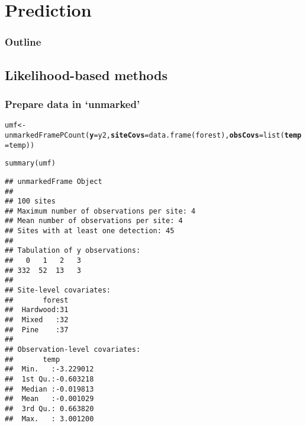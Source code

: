 \documentclass[color=usenames,dvipsnames]{beamer}\usepackage[]{graphicx}\usepackage[]{color}
\makeatletter
\newcommand{\hlstd}[1]{\textcolor[rgb]{0,0,0}{#1}}%
\newcommand{\hlkwb}[1]{\textcolor[rgb]{0,0.341,0.682}{#1}}%
\newcommand{\hlkwc}[1]{\textcolor[rgb]{0,0,0}{\textbf{#1}}}%
\newcommand{\hlkwd}[1]{\textcolor[rgb]{0.004,0.004,0.506}{#1}}%
\newenvironment{kframe}{%
 \def\at@end@of@kframe{}%
 \ifinner\ifhmode%
  \def\at@end@of@kframe{\end{minipage}}%
  \begin{minipage}{\columnwidth}%
 \fi\fi%
 \def\FrameCommand##1{\hskip\@totalleftmargin \hskip-\fboxsep
 \colorbox{shadecolor}{##1}\hskip-\fboxsep
     \hskip-\linewidth \hskip-\@totalleftmargin \hskip\columnwidth}%
 \MakeFramed {\advance\hsize-\width
   \@totalleftmargin\z@ \linewidth\hsize
   \@setminipage}}%
 {\par\unskip\endMakeFramed%
 \at@end@of@kframe}
\newenvironment{knitrout}{}{} %
\makeatother
\begin{document}
\begin{frame}[fragile]
\begin{columns}
\begin{column}{0.6\textwidth}
  \end{column}
  \end{columns}
\end{frame}



\section{Prediction}



\begin{frame}
  \frametitle{Outline}
  \Large
  \tableofcontents[currentsection]
\end{frame}



\subsection{Likelihood-based methods}



\begin{frame}[fragile]
  \frametitle{Prepare data in `unmarked'}
  \small
\begin{knitrout}\tiny
{}\color{fgcolor}\begin{kframe}
\begin{alltt}
\hlstd{umf} \hlkwb{<-} \hlkwd{unmarkedFramePCount}\hlstd{(}\hlkwc{y}\hlstd{=y2,} \hlkwc{siteCovs}\hlstd{=}\hlkwd{data.frame}\hlstd{(forest),} \hlkwc{obsCovs}\hlstd{=}\hlkwd{list}\hlstd{(}\hlkwc{temp}\hlstd{=temp))}
\end{alltt}
\end{kframe}
\end{knitrout}
\pause
\begin{knitrout}\tiny
{}\color{fgcolor}\begin{kframe}
\begin{alltt}
\hlkwd{summary}\hlstd{(umf)}
\end{alltt}
\begin{verbatim}
## unmarkedFrame Object
## 
## 100 sites
## Maximum number of observations per site: 4 
## Mean number of observations per site: 4 
## Sites with at least one detection: 45 
## 
## Tabulation of y observations:
##   0   1   2   3 
## 332  52  13   3 
## 
## Site-level covariates:
##       forest  
##  Hardwood:31  
##  Mixed   :32  
##  Pine    :37  
## 
## Observation-level covariates:
##       temp          
##  Min.   :-3.229012  
##  1st Qu.:-0.603218  
##  Median :-0.019813  
##  Mean   :-0.001029  
##  3rd Qu.: 0.663820  
##  Max.   : 3.001200
\end{verbatim}
\end{kframe}
\end{knitrout}
\end{frame}
\end{document}
